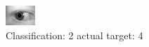 \begin{figure}[h!]
\begin{center}
\includegraphics[width=0.60\columnwidth]{figures/ID841_class_2_target_4.png}
\end{center}
\caption{ Classification: 2 actual target: 4}
\label{fig:ID841_class_2_target_4}
\end{figure}
